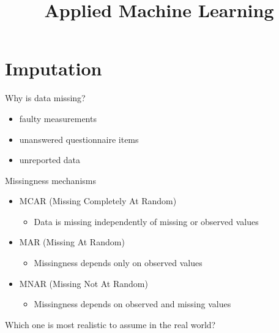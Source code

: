 \documentclass[10pt,compress,t,notes=noshow, xcolor=table]{beamer}
\title{Applied Machine Learning}
\date{}
\begin{document}
%


\section{Imputation}

\begin{frame}{Why is data missing? \href{https://arxiv.org/pdf/2407.19804}{}}
    \vfill
    \begin{itemize}
        \item faulty measurements
        \item unanswered questionnaire items
        \item unreported data
    \end{itemize}
    \vfill
\end{frame}
\begin{frame}{Missingness mechanisms}
    \vfill
    \begin{itemize}
        \item MCAR (Missing Completely At Random)
        \begin{itemize}
            \item Data is missing independently of missing or observed values
        \end{itemize}
        \item MAR (Missing At Random)
        \begin{itemize}
            \item Missingness depends only on observed values
        \end{itemize}
        \item MNAR (Missing Not At Random)
        \begin{itemize}
            \item Missingness depends on observed and missing values
        \end{itemize}
    \end{itemize}    
    \vfill
    \pause
    Which one is most realistic to assume in the real world?
    \vfill
\end{frame}
\end{document}
